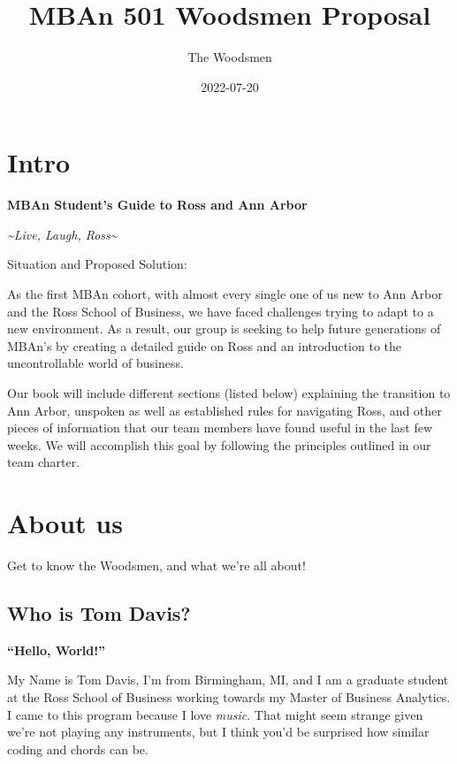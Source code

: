 \documentclass[
]{book}
\title{MBAn 501 Woodsmen Proposal}
\author{The Woodsmen}
\date{2022-07-20}
\begin{document}
\maketitle

{
\setcounter{tocdepth}{1}
\tableofcontents
}
\hypertarget{intro}{%
\chapter{Intro}\label{intro}}

\textbf{MBAn Student's Guide to Ross and Ann Arbor}

\emph{\textasciitilde Live, Laugh, Ross\textasciitilde{}}

Situation and Proposed Solution:

As the first MBAn cohort, with almost every single one of us new to Ann Arbor and the Ross School of Business, we have faced challenges trying to adapt to a new environment. As a result, our group is seeking to help future generations of MBAn's by creating a detailed guide on Ross and an introduction to the uncontrollable world of business.

Our book will include different sections (listed below) explaining the transition to Ann Arbor, unspoken as well as established rules for navigating Ross, and other pieces of information that our team members have found useful in the last few weeks. We will accomplish this goal by following the principles outlined in our team charter.

\hypertarget{about-us}{%
\chapter{About us}\label{about-us}}

Get to know the Woodsmen, and what we're all about!

\hypertarget{who-is-tom-davis}{%
\section{Who is Tom Davis?}\label{who-is-tom-davis}}

\textbf{``Hello, World!''}

My Name is Tom Davis, I'm from Birmingham, MI, and I am a graduate student at the Ross School of Business working towards my Master of Business Analytics. I came to this program because I love \emph{music}. That might seem strange given we're not playing any instruments, but I think you'd be surprised how similar coding and chords can be.
\end{document}
